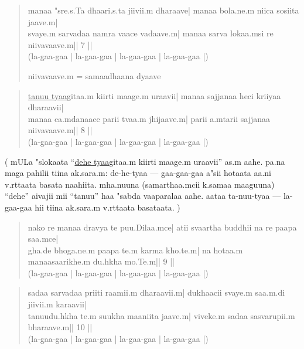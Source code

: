 \documentclass[a4paper]{article}
\begin{document}
    \begin{verse}
        manaa "sre.s.Ta dhaari.s.ta jiivii.m dharaave|
        manaa bola.ne.m niica sosiita jaave.m|\\

        svaye.m sarvadaa namra vaace vadaave.m|
        manaa sarva lokaa.msi re niivavaave.m|| 7 ||\\
        (la-gaa-gaa | la-gaa-gaa | la-gaa-gaa | la-gaa-gaa |)

        niivavaave.m = samaadhaana dyaave
    \end{verse}

    \begin{verse}
        \underline{tanuu tyaa}gitaa.m kiirti maage.m uraavii|
        manaa sajjanaa heci kriiyaa dharaavii|\\

        manaa ca.mdanaace parii tvaa.m jhijaave.m|
        parii a.mtarii sajjanaa niivavaave.m|| 8 ||\\
        (la-gaa-gaa | la-gaa-gaa | la-gaa-gaa | la-gaa-gaa |)
    \end{verse}

    \vspace{2mm}
    \parbox{8cm}
    {
        \small
        {
            (
                mULa "slokaata ``\underline{dehe tyaa}gitaa.m kiirti maage.m uraavii'' as.m aahe.
                pa.na maga pahilii tiina ak.sara.m: de-he-tyaa --- gaa-gaa-gaa 
                a"sii hotaata aa.ni v.rttaata basata naahiita. mha.nuuna 
                (samarthaa.mcii k.samaa maaguuna) ``dehe'' 
                aivajii mii ``tanuu'' haa "sabda vaaparalaa aahe. aataa 
                ta-nuu-tyaa --- la-gaa-gaa hii tiina ak.sara.m v.rttaata basataata.
            )
        }
    }
    \begin{verse}
        nako re manaa dravya te puu.Dilaa.mce|
        atii svaartha buddhii na re paapa saa.mce|\\

        gha.de bhoga.ne.m paapa te.m karma kho.te.m|
        na hotaa.m manaasaarikhe.m du.hkha mo.Te.m|| 9 ||\\
        (la-gaa-gaa | la-gaa-gaa | la-gaa-gaa | la-gaa-gaa |)
    \end{verse}

    \begin{verse}
        sadaa sarvadaa priiti raamii.m dharaavii.m|
        dukhaacii svaye.m saa.m.di jiivii.m karaavii|\\

        tanuudu.hkha te.m suukha maaniita jaave.m|
        viveke.m sadaa sasvarupii.m bharaave.m|| 10 ||\\
        (la-gaa-gaa | la-gaa-gaa | la-gaa-gaa | la-gaa-gaa |)
    \end{verse}
\end{document}
